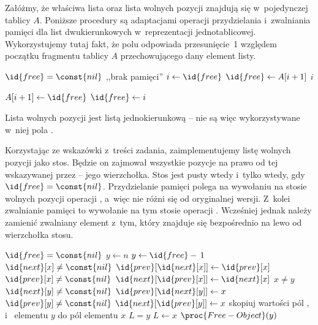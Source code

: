 \exercise %
Załóżmy, że właściwa lista oraz lista wolnych pozycji znajdują się w~pojedynczej tablicy $A$. Poniższe procedury są adaptacjami operacji przydzielania i~zwalniania pamięci dla list dwukierunkowych w~reprezentacji jednotablicowej. Wykorzystujemy tutaj fakt, że polu  odpowiada przesunięcie~1 względem początku fragmentu tablicy $A$ przechowującego dany element listy.
\begin{codebox}
\li	\If $\id{free}=\const{nil}$
\li		\Then \Error ,,brak pamięci''
		\End
\li	$i\gets\id{free}$
\li	$\id{free}\gets A[i+1]$
\li	\Return $i$
\end{codebox}

\begin{codebox}
\li	$A[i+1]\gets\id{free}$
\li	$\id{free}\gets i$
\end{codebox}

\exercise %
Lista wolnych pozycji jest listą jednokierunkową -- nie są więc wykorzystywane w~niej pola .

\exercise %
Korzystając ze wskazówki z~treści zadania, zaimplementujemy listę wolnych pozycji jako stos. Będzie on zajmował wszystkie pozycje na prawo od tej wskazywanej przez  -- jego wierzchołka. Stos jest pusty wtedy i~tylko wtedy, gdy $\id{free}=\const{nil}$. Przydzielanie pamięci polega na wywołaniu na stosie wolnych pozycji operacji , a~więc nie różni się od oryginalnej wersji. Z~kolei zwalnianie pamięci to wywołanie na tym stosie operacji . Wcześniej jednak należy zamienić zwalniany element z~tym, który znajduje się bezpośrednio na lewo od wierzchołka stosu.
\begin{codebox}
\li	\If $\id{free}=\const{nil}$
\li		\Then $y\gets n$
\li		\Else $y\gets\id{free}-\,1$
		\End
\li	\If $\id{next}[x]\ne\const{nil}$
\li		\Then $\id{prev}[\id{next}[x]]\gets\id{prev}[x]$
		\End
\li	\If $\id{prev}[x]\ne\const{nil}$
\li		\Then $\id{next}[\id{prev}[x]]\gets\id{next}[x]$
		\End
\li	\If $x\ne y$
\li		\Then
			\If $\id{next}[y]\ne\const{nil}$
\li				\Then $\id{prev}[\id{next}[y]]\gets x$
				\End
\li			\If $\id{prev}[y]\ne\const{nil}$
\li				\Then $\id{next}[\id{prev}[y]]\gets x$
				\End
		\End
\li	skopiuj wartości pól ,  i~ elementu $y$ do pól elementu $x$
\li	\If $L=y$
\li		\Then $L\gets x$
		\End
\li	$\proc{Free-Object}(y)$
\end{codebox}

